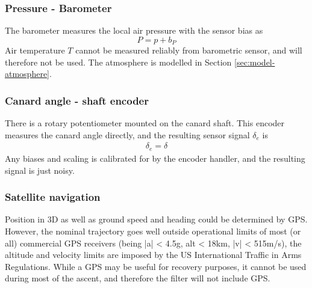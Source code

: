 \subsubsection{Pressure - Barometer}
The barometer measures the local air pressure with the sensor bias as
\begin{equation}
    P = p + b_P
\end{equation}
Air temperature $T$ cannot be measured reliably from barometric sensor, and will therefore not be used.
The atmosphere is modelled in Section \ref{sec:model-atmosphere}.

\subsubsection{Canard angle - shaft encoder}
There is a rotary potentiometer mounted on the canard shaft.
This encoder measures the canard angle directly, and the resulting sensor signal $\delta_e$ is 
\begin{align}
    \delta_e = \delta
\end{align}
Any biases and scaling is calibrated for by the encoder handler, and the resulting signal is just noisy. 

\subsubsection{Satellite navigation}
Position in 3D as well as ground speed and heading could be determined by GPS.
However, the nominal trajectory goes well outside operational limits of most (or all) commercial GPS receivers (being |a| < 4.5g, alt < 18km, |v| < 515m/s), the altitude and velocity limits are imposed by the US International Traffic in Arms Regulations.
While a GPS may be useful for recovery purposes, it cannot be used during most of the ascent, and therefore the filter will not include GPS.

